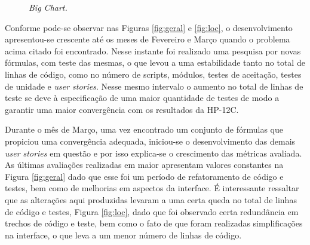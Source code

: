\begin{figure}[!h]
 \caption{\it Big Chart.} \label{fig:bigchart}
\end{figure}

Conforme pode-se observar nas Figuras \ref{fig:geral} e \ref{fig:loc}, o desenvolvimento apresentou-se crescente até os meses de Fevereiro e Março quando o problema acima citado foi encontrado. Nesse instante foi realizado uma pesquisa por novas fórmulas, com teste das mesmas, o que levou a uma estabilidade tanto no total de linhas de código, como no número de scripts, módulos, testes de aceitação, testes de unidade e \textit{user stories}. Nesse mesmo intervalo o aumento no total de linhas de teste se deve à especificação de uma maior quantidade de testes de modo a garantir uma maior convergência com os resultados da HP-12C.

Durante o mês de Março, uma vez encontrado um conjunto de fórmulas que propiciou uma convergência adequada, iniciou-se o desenvolvimento das demais \textit{user stories} em questão e por isso explica-se o crescimento das métricas avaliada. As últimas avaliações realizadas em maior apresentam valores constantes na Figura \ref{fig:geral} dado que esse foi um período de refatoramento de código e testes, bem como de melhorias em aspectos da interface. É interessante ressaltar que as alterações aqui produzidas levaram a uma certa queda no total de linhas de código e testes, Figura \ref{fig:loc}, dado que foi observado certa redundância em trechos de código e teste, bem como o fato de que foram realizadas simplificações na interface, o que leva a um menor número de linhas de código.

